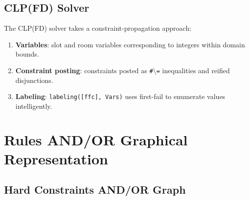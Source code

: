 \documentclass[11pt,letterpaper]{article}
\begin{document}
\subsection{CLP(FD) Solver}
The CLP(FD) solver takes a constraint-propagation approach:
\begin{enumerate}[nosep]
  \item \textbf{Variables}: slot and room variables corresponding to integers within domain bounds.
  \item \textbf{Constraint posting}: constraints posted as \texttt{\#$\setminus$=} inequalities and reified disjunctions.
  \item \textbf{Labeling}: \texttt{labeling([ffc], Vars)} uses first-fail to enumerate values intelligently.
\end{enumerate}

\section{Rules AND/OR Graphical Representation}
\subsection{Hard Constraints AND/OR Graph}
\end{document}
